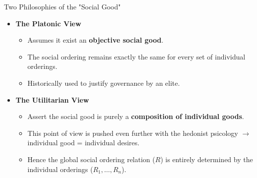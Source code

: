 \documentclass{beamer}
\begin{document}
\begin{frame}{Two Philosophies of the "Social Good"}
    \begin{itemize}
        \item \textbf{The Platonic View} 
        \begin{itemize}
            \item[$\Rightarrow$] Assumes it exist an \textbf{objective social good}.
            \item The social ordering remains exactly the same for every set of individual orderings.
            \item Historically used to justify governance by an elite.
        \end{itemize}
        \vspace{0.3 cm}
        \item \textbf{The Utilitarian View} 
        \begin{itemize}
            \item Assert the social good is purely a \textbf{composition of individual goods}.
            \item This point of view is pushed even further with the hedonist psicology $\rightarrow$ individual good = individual desires.
            \item[$\Rightarrow$] Hence the global social ordering relation ($R$) is entirely determined by the individual orderings ($R_1, \dots, R_n$).
        \end{itemize}
    \end{itemize}

\end{frame}
\end{document}
